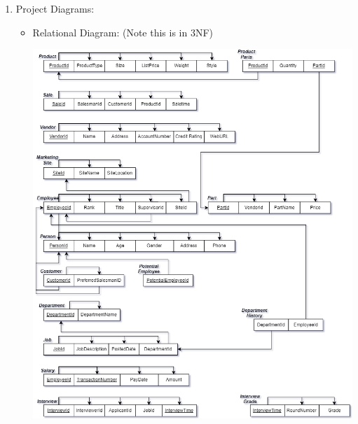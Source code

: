 \documentclass[12pt]{article}
\begin{document}
\begin{enumerate}
		\item Project Diagrams: 
			\begin{itemize}
				\item Relational Diagram: (Note this is in 3NF)
				\begin{center}
					\includegraphics[scale=.5]{completed_diags/conceptual}
				\end{center}
				
				\pagebreak
				

\end{itemize}
\end{enumerate}
\end{document}
